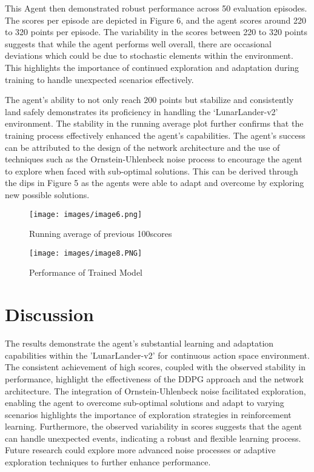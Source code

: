 \documentclass[conference]{IEEEtran}
\begin{document}
This Agent then demonstrated robust performance across 50 evaluation episodes. The scores per episode are depicted in Figure 6, and the agent scores around 220 to 320 points per episode. The variability in the scores between 220 to 320 points suggests that while the agent performs well overall, there are occasional deviations which could be due to stochastic elements within the environment. This highlights the importance of continued exploration and adaptation during training to handle unexpected scenarios effectively.

The agent's ability to not only reach 200 points but stabilize and consistently land safely demonstrates its proficiency in handling the ‘LunarLander-v2’ environment. The stability in the running average plot further confirms that the training process effectively enhanced the agent’s capabilities. The agent’s success can be attributed to the design of the network architecture and the use of techniques such as the Ornstein-Uhlenbeck noise process to encourage the agent to explore when faced with sub-optimal solutions. This can be derived through the dips in Figure 5 as the agents were able to adapt and overcome by exploring new possible solutions.
\begin{figure}[htp]
    \centering
    \texttt{[image: images/image6.png]}
    \caption{Running average of previous 100scores}
    \label{fig:Average Score}
\end{figure}

\begin{figure}[htp]
    \centering
    \texttt{[image: images/image8.PNG]}
    \caption{Performance of Trained Model}
    \label{fig:Trained Model}
\end{figure}


\section{Discussion}
The results demonstrate the agent's substantial learning and adaptation capabilities within the 'LunarLander-v2' for continuous action space environment. The consistent achievement of high scores, coupled with the observed stability in performance, highlight the effectiveness of the DDPG approach and the network architecture. The integration of Ornstein-Uhlenbeck noise facilitated exploration, enabling the agent to overcome sub-optimal solutions and adapt to varying scenarios highlights the importance of exploration strategies in reinforcement learning. Furthermore, the observed variability in scores suggests that the agent can handle unexpected events, indicating a robust and flexible learning process. Future research could explore more advanced noise processes or adaptive exploration techniques to further enhance performance.
\end{document}
